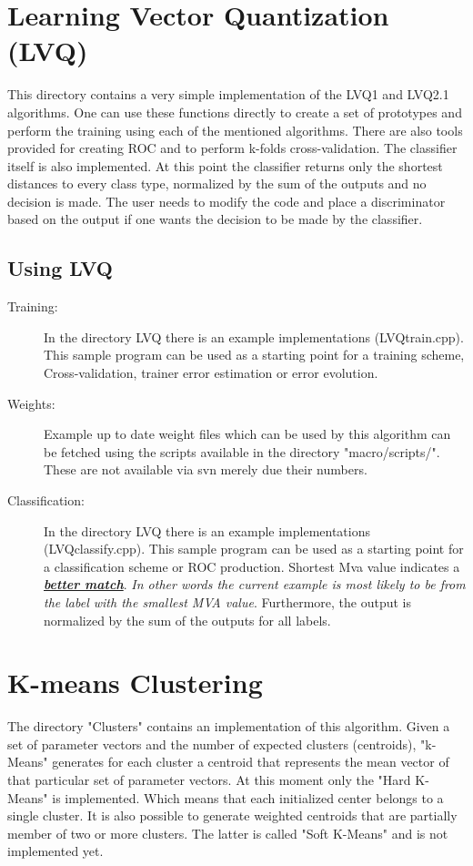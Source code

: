 \documentclass[twoside, a4paper, final]{article}
\begin{document}
\section{Learning Vector Quantization (LVQ)}
This directory contains a very simple implementation of the LVQ1 and
LVQ2.1 algorithms. One can use these functions directly to create a
set of prototypes and perform the training using each of the mentioned
algorithms. There are also tools provided for creating ROC and to
perform k-folds cross-validation. The classifier itself is also
implemented. At this point the classifier returns only the shortest
distances to every class type, normalized by the sum of the outputs
and no decision is made. The user needs to modify the code and place a
discriminator based on the output if one wants the decision to be made
by the classifier.

\subsection{Using LVQ}
\begin{description}
\item [Training:] In the directory LVQ there is an example
  implementations (LVQtrain.cpp). This sample program can be used as a
  starting point for a training scheme, Cross-validation, trainer
  error estimation or error evolution.
\item [Weights:] Example up to date weight files which can be used by
  this algorithm can be fetched using the scripts available in the
  directory "macro/scripts/". These are not available via svn merely
  due their numbers.
\item [Classification:] In the directory LVQ there is an example
  implementations (LVQclassify.cpp). This sample program can be used
  as a starting point for a classification scheme or ROC
  production. Shortest Mva value indicates a \underline{{\it{\bf
        better match}}}. {\it In other words the current example is
    most likely to be from the label with the smallest MVA
    value}. Furthermore, the output is normalized by the sum of the
  outputs for all labels.
\end{description} 

\section{K-means Clustering}
The directory "Clusters" contains an implementation of this
algorithm. Given a set of parameter vectors and the number of expected
clusters (centroids), "k-Means" generates for each cluster a centroid
that represents the mean vector of that particular set of parameter
vectors. At this moment only the "Hard K-Means" is implemented. Which
means that each initialized center belongs to a single cluster. It is
also possible to generate weighted centroids that are partially member
of two or more clusters. The latter is called "Soft K-Means" and is
not implemented yet.
\end{document}
